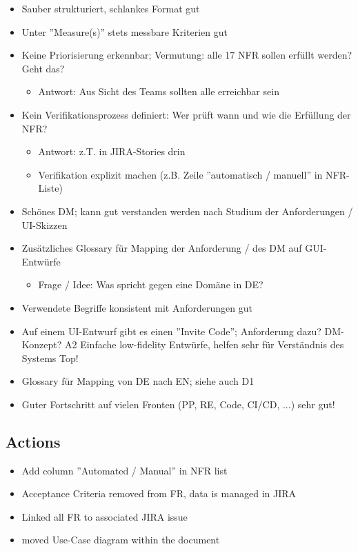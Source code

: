 \begin{itemize}
\begin{itemize}
    \end{itemize}
    \item Sauber strukturiert, schlankes Format \textrightarrow gut
    \item Unter ''Measure(s)'' stets messbare Kriterien \textrightarrow gut
    \item Keine Priorisierung erkennbar; Vermutung: alle 17 NFR sollen erfüllt werden? Geht das?
    \begin{itemize}
        \item Antwort: Aus Sicht des Teams sollten alle erreichbar sein
    \end{itemize}
    \item Kein Verifikationsprozess definiert: Wer prüft wann und wie die Erfüllung der NFR?
    \begin{itemize}
        \item Antwort: z.T. in JIRA-Stories drin
        \item Verifikation explizit machen (z.B. Zeile ''automatisch / manuell'' in NFR-Liste)
    \end{itemize}
    \item Schönes DM; kann gut verstanden werden nach Studium der Anforderungen / UI-Skizzen
    \item Zusätzliches Glossary für Mapping der Anforderung / des DM auf GUI-Entwürfe
    \begin{itemize}
        \item Frage / Idee: Was spricht gegen eine Domäne in DE?
    \end{itemize}
    \item Verwendete Begriffe konsistent mit Anforderungen \textrightarrow gut
    \item Auf einem UI-Entwurf gibt es einen ''Invite Code''; Anforderung dazu? DM-Konzept? A2 Einfache low-fidelity Entwürfe, helfen sehr für Verständnis des Systems \textrightarrow Top!
    \item Glossary für Mapping von DE nach EN; siehe auch D1
    \item Guter Fortschritt auf vielen Fronten (PP, RE, Code, CI/CD, ...) \textrightarrow sehr gut!
\end{itemize}

\subsection{Actions}

\begin{itemize}
    \item Add column ''Automated / Manual'' in NFR list
    \item Acceptance Criteria removed from FR, data is managed in JIRA
    \item Linked all FR to associated JIRA issue
    \item moved Use-Case diagram within the document
\end{itemize}


